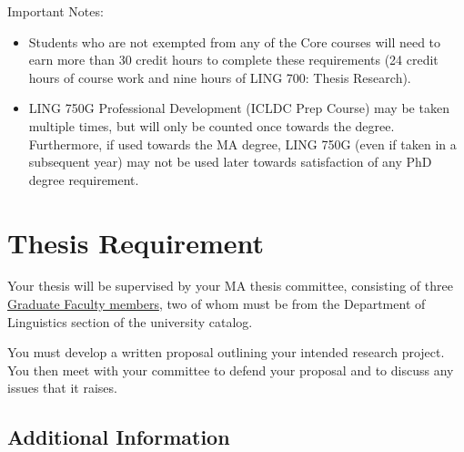 \documentclass[
]{book}
\providecommand{\tightlist}{%
  \setlength{\itemsep}{0pt}\setlength{\parskip}{0pt}}
\begin{document}
Important Notes:

\begin{itemize}
\tightlist
\item
  Students who are not exempted from any of the Core courses will need to earn more than 30 credit hours to complete these requirements (24 credit hours of course work and nine hours of LING 700: Thesis Research).
\item
  LING 750G Professional Development (ICLDC Prep Course) may be taken multiple times, but will only be counted once towards the degree. Furthermore, if used towards the MA degree, LING 750G (even if taken in a subsequent year) may not be used later towards satisfaction of any PhD degree requirement.
\end{itemize}

\section{Thesis Requirement}\label{thesis-requirement}

Your thesis will be supervised by your MA thesis committee, consisting of three \href{http://manoa.hawaii.edu/graduate/content/select-committee-member}{Graduate Faculty members}, two of whom must be from the Department of Linguistics section of the university catalog.

You must develop a written proposal outlining your intended research project. You then meet with your committee to defend your proposal and to discuss any issues that it raises.

\subsection{Additional Information}\label{additional-information}
\end{document}
